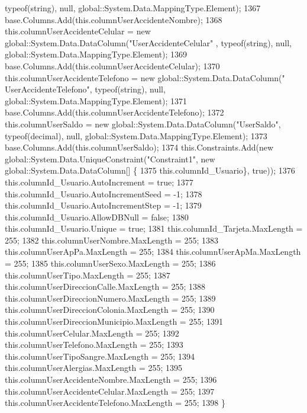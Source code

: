 \begin{DoxyCode}
      typeof(\textcolor{keywordtype}{string}), null, global::System.Data.MappingType.Element);
1367                 base.Columns.Add(this.columnUserAccidenteNombre);
1368                 this.columnUserAccidenteCelular = \textcolor{keyword}{new} global::System.Data.DataColumn(\textcolor{stringliteral}{"UserAccidenteCelular"}
      , typeof(\textcolor{keywordtype}{string}), null, global::System.Data.MappingType.Element);
1369                 base.Columns.Add(this.columnUserAccidenteCelular);
1370                 this.columnUserAccidenteTelefono = \textcolor{keyword}{new} global::System.Data.DataColumn(\textcolor{stringliteral}{"
      UserAccidenteTelefono"}, typeof(\textcolor{keywordtype}{string}), null, global::System.Data.MappingType.Element);
1371                 base.Columns.Add(this.columnUserAccidenteTelefono);
1372                 this.columnUserSaldo = \textcolor{keyword}{new} global::System.Data.DataColumn(\textcolor{stringliteral}{"UserSaldo"}, typeof(decimal), 
      null, global::System.Data.MappingType.Element);
1373                 base.Columns.Add(this.columnUserSaldo);
1374                 this.Constraints.Add(\textcolor{keyword}{new} global::System.Data.UniqueConstraint(\textcolor{stringliteral}{"Constraint1"}, \textcolor{keyword}{new} 
      global::System.Data.DataColumn[] \{
1375                                 this.columnId\_Usuario\}, \textcolor{keyword}{true}));
1376                 this.columnId\_Usuario.AutoIncrement = \textcolor{keyword}{true};
1377                 this.columnId\_Usuario.AutoIncrementSeed = -1;
1378                 this.columnId\_Usuario.AutoIncrementStep = -1;
1379                 this.columnId\_Usuario.AllowDBNull = \textcolor{keyword}{false};
1380                 this.columnId\_Usuario.Unique = \textcolor{keyword}{true};
1381                 this.columnId\_Tarjeta.MaxLength = 255;
1382                 this.columnUserNombre.MaxLength = 255;
1383                 this.columnUserApPa.MaxLength = 255;
1384                 this.columnUserApMa.MaxLength = 255;
1385                 this.columnUserSexo.MaxLength = 255;
1386                 this.columnUserTipo.MaxLength = 255;
1387                 this.columnUserDireccionCalle.MaxLength = 255;
1388                 this.columnUserDireccionNumero.MaxLength = 255;
1389                 this.columnUserDireccionColonia.MaxLength = 255;
1390                 this.columnUserDireccionMunicipio.MaxLength = 255;
1391                 this.columnUserCelular.MaxLength = 255;
1392                 this.columnUserTelefono.MaxLength = 255;
1393                 this.columnUserTipoSangre.MaxLength = 255;
1394                 this.columnUserAlergias.MaxLength = 255;
1395                 this.columnUserAccidenteNombre.MaxLength = 255;
1396                 this.columnUserAccidenteCelular.MaxLength = 255;
1397                 this.columnUserAccidenteTelefono.MaxLength = 255;
1398             \}
\end{DoxyCode}
